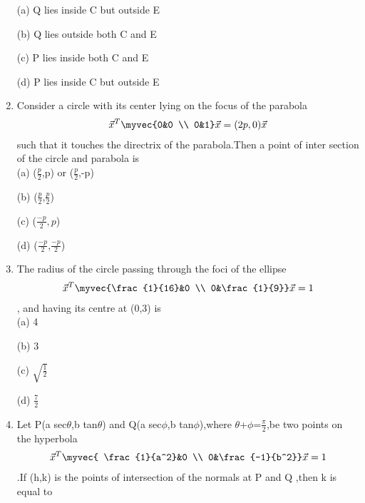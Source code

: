 \begin{enumerate}
    \choice (a) Q lies inside C but outside E
    
    \choice (b) Q lies outside both C and E 
    
    \choice (c) P lies inside both C and E 
    
    \choice (d) P lies inside C but outside E\\
    
    \item Consider a circle with its center lying on the focus of the parabola \begin{align}\vec x^T \myvec {0&0 \\ 0&1}\vec x=(2p,0)\vec x\end{align}  such that it touches the directrix of the parabola.Then a point of inter section of the circle and parabola is\\
    
    \choice (a) ($\frac{p}{2}$,p) or ($\frac{p}{2}$,-p)
    
    \choice (b) ($\frac{p}{2}$,$\frac{p}{2}$)
    
    \choice (c) ($\frac{-p}{2},p$)
    
    \choice (d) ($\frac{-p}{2}$,$\frac{-p}{2}$)\\
    
    \item The radius of the circle passing through the foci of the ellipse \begin{align}\vec x^T \myvec {\frac{1}{16}&0 \\ 0&\frac{1}{9}}\vec x=1\end{align}, and having its centre at (0,3) is \\
    
    \choice (a) 4
    
    \choice (b) 3
    
    \choice (c) $\sqrt{\frac{1}{2}}$
    
    \choice (d) $\frac{7}{2}$\\
    
    \item Let P(a sec$\theta$,b tan$\theta$) and Q(a sec$\phi$,b tan$\phi$),where $\theta$+$\phi$=$\frac{\pi}{2}$,be two points on the hyperbola \begin{align}\vec x^T \myvec{ \frac{1}{a^2}&0 \\ 0&\frac{-1}{b^2}}\vec x=1\end{align}.If (h,k) is the points of intersection of the normals at P and Q ,then k is equal to\\
    

\end{enumerate}
